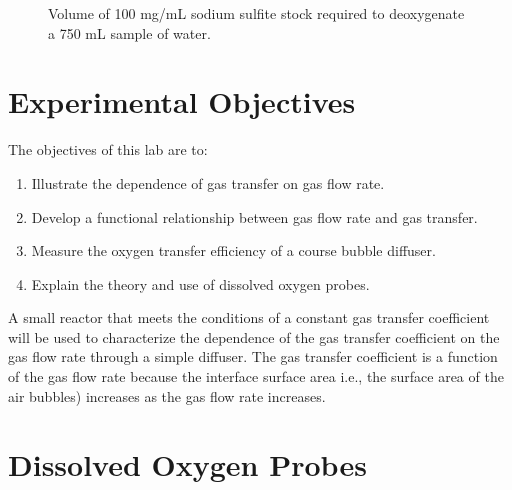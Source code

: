 \documentclass[letterpaper,10pt,english]{sphinxmanual}
\let\sphinxpxdimen\pdfpxdimen\else\newdimen\sphinxpxdimen
\begin{document}
\begin{figure}[htbp]
\centering
\capstart

\noindent\sphinxincludegraphics[width=300\sphinxpxdimen]{{Sulfite}.png}
\caption{Volume of 100 mg/mL sodium sulfite stock required to deoxygenate a 750 mL sample of water.}\label{\detokenize{Gas_Transfer/Gas_Transfer:id4}}\label{\detokenize{Gas_Transfer/Gas_Transfer:figure-sulfite}}\end{figure}


\section{Experimental Objectives}
\label{\detokenize{Gas_Transfer/Gas_Transfer:experimental-objectives}}\label{\detokenize{Gas_Transfer/Gas_Transfer:heading-gas-transfer-experimental-objectives}}
The objectives of this lab are to:
\begin{enumerate}
\item {} 
Illustrate the dependence of gas transfer on gas flow rate.

\item {} 
Develop a functional relationship between gas flow rate and gas transfer.

\item {} 
Measure the oxygen transfer efficiency of a course bubble diffuser.

\item {} 
Explain the theory and use of dissolved oxygen probes.

\end{enumerate}

A small reactor that meets the conditions of a constant gas transfer coefficient will be used to characterize the dependence of the gas transfer coefficient on the gas flow rate through a simple diffuser. The gas transfer coefficient is a function of the gas flow rate because the interface surface area i.e., the surface area of the air bubbles) increases as the gas flow rate increases.


\section{Dissolved Oxygen Probes}
\label{\detokenize{Gas_Transfer/Gas_Transfer:dissolved-oxygen-probes}}\label{\detokenize{Gas_Transfer/Gas_Transfer:heading-gas-transfer-dissolved-oxygen-probes}}
\end{document}
